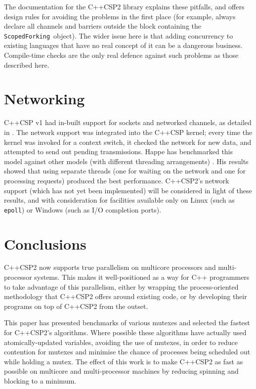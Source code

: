 \documentclass[12pt]{IOS-Book-Article-CPA-2007}
\newcommand{\code}[1]{{\small\texttt{#1}}}
\begin{document}
The documentation for the C++CSP2 library explains these pitfalls, and offers design rules for avoiding the problems in the first place (for example, always
declare all channels and barriers outside the block containing the \code{ScopedForking}~object).  The 
wider issue here is that adding concurrency to existing languages that have no real concept of it can be a dangerous business.  Compile-time checks are 
the only real defence against such problems as those described here.

\section{Networking}

\label{sec-networking}

C++CSP v1 had in-built support for sockets and networked channels, as detailed in \cite{brown-c++cspnet-04}.  The network support was integrated into 
the C++CSP kernel; every time the kernel was invoked for a context switch, it checked the network for new data, and attempted to send out pending 
transmissions.  Happe has benchmarked this model against other models (with different threading arrangements) \cite{happe-tcp-06}.  His results showed 
that using separate threads (one for waiting on the network and one for processing requests) produced the best performance.  C++CSP2's network support 
(which has not yet been implemented) will be considered in light of these results, and with consideration for facilities available only on Linux (such 
as \code{epoll}) or Windows (such as I/O completion ports).

\section{Conclusions}

\label{sec-conc}

C++CSP2 now supports true parallelism on multicore processors and multi-processor systems.  This makes it well-positioned as a way for C++ 
programmers to take advantage of this parallelism, either by wrapping the process-oriented methodology that C++CSP2 offers around existing code, or by 
developing their programs on top of C++CSP2 from the outset.

This paper has presented benchmarks of various mutexes and selected the fastest for C++CSP2's algorithms.  Where possible these algorithms have 
actually used atomically-updated variables, avoiding the use of mutexes, in order to reduce contention for mutexes and minimise the chance of 
processes being scheduled out while holding a mutex.  The effect of this work is to make C++CSP2 as fast as possible on 
multicore and multi-processor machines by reducing spinning and blocking to a minimum.
\end{document}
